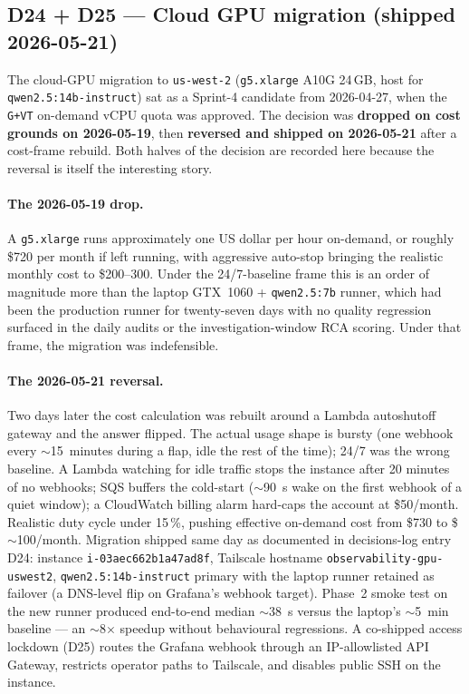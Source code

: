 \documentclass[11pt,a4paper,oneside]{report}
\begin{document}
\subsection{D24 + D25 --- Cloud GPU migration (shipped 2026-05-21)}
\label{sec:gpu-shipped}

The cloud-GPU migration to \texttt{us-west-2} (\texttt{g5.xlarge}
A10G 24\,GB, host for \texttt{qwen2.5:14b-instruct}) sat as a
Sprint-4 candidate from 2026-04-27, when the \texttt{G+VT}
on-demand vCPU quota was approved.  The decision was
\textbf{dropped on cost grounds on 2026-05-19}, then
\textbf{reversed and shipped on 2026-05-21} after a cost-frame
rebuild.  Both halves of the decision are recorded here because
the reversal is itself the interesting story.

\paragraph{The 2026-05-19 drop.}
A \texttt{g5.xlarge} runs approximately one US dollar per hour
on-demand, or roughly \$720 per month if left running, with
aggressive auto-stop bringing the realistic monthly cost to
\$200--300.  Under the 24/7-baseline frame this is an order of
magnitude more than the laptop GTX~1060 + \texttt{qwen2.5:7b}
runner, which had been the production runner for twenty-seven
days with no quality regression surfaced in the daily audits or
the investigation-window RCA scoring.  Under that frame, the
migration was indefensible.

\paragraph{The 2026-05-21 reversal.}
Two days later the cost calculation was rebuilt around a Lambda
autoshutoff gateway and the answer flipped.  The actual usage
shape is bursty (one webhook every $\sim$15~minutes during a
flap, idle the rest of the time); 24/7 was the wrong baseline.
A Lambda watching for idle traffic stops the instance after 20
minutes of no webhooks; SQS buffers the cold-start ($\sim$90~s
wake on the first webhook of a quiet window); a CloudWatch
billing alarm hard-caps the account at \$50/month.  Realistic
duty cycle under 15\,\%, pushing effective on-demand cost from
\$730 to \$$\sim$100/month.  Migration shipped same day as
documented in decisions-log entry D24: instance
\texttt{i-03aec662b1a47ad8f}, Tailscale hostname
\texttt{observability-gpu-uswest2},
\texttt{qwen2.5:14b-instruct} primary with the laptop runner
retained as failover (a DNS-level flip on Grafana's webhook
target).  Phase~2 smoke test on the new runner produced
end-to-end median $\sim$38~s versus the laptop's $\sim$5~min
baseline --- an $\sim$8$\times$ speedup without behavioural
regressions.  A co-shipped access lockdown (D25) routes the
Grafana webhook through an IP-allowlisted API Gateway,
restricts operator paths to Tailscale, and disables public SSH
on the instance.
\end{document}
